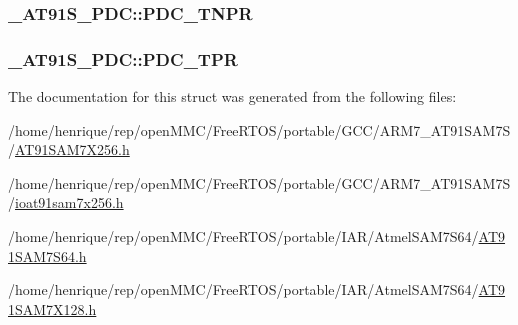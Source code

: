\hypertarget{struct__AT91S__PDC_a21220f0508a5ec5c7737a82afa89dc35}{
\subsubsection[{P\-D\-C\-\_\-\-T\-N\-P\-R}]{ \-\_\-\-A\-T91\-S\-\_\-\-P\-D\-C\-::\-P\-D\-C\-\_\-\-T\-N\-P\-R}}\label{struct__AT91S__PDC_a21220f0508a5ec5c7737a82afa89dc35}
\hypertarget{struct__AT91S__PDC_a15d473588119af649205c986be0e6639}{
\subsubsection[{P\-D\-C\-\_\-\-T\-P\-R}]{ \-\_\-\-A\-T91\-S\-\_\-\-P\-D\-C\-::\-P\-D\-C\-\_\-\-T\-P\-R}}\label{struct__AT91S__PDC_a15d473588119af649205c986be0e6639}


The documentation for this struct was generated from the following files\-:\begin{DoxyCompactItemize}
\item 
/home/henrique/rep/open\-M\-M\-C/\-Free\-R\-T\-O\-S/portable/\-G\-C\-C/\-A\-R\-M7\-\_\-\-A\-T91\-S\-A\-M7\-S/\hyperlink{GCC_2ARM7__AT91SAM7S_2AT91SAM7X256_8h}{A\-T91\-S\-A\-M7\-X256.\-h}\item 
/home/henrique/rep/open\-M\-M\-C/\-Free\-R\-T\-O\-S/portable/\-G\-C\-C/\-A\-R\-M7\-\_\-\-A\-T91\-S\-A\-M7\-S/\hyperlink{ioat91sam7x256_8h}{ioat91sam7x256.\-h}\item 
/home/henrique/rep/open\-M\-M\-C/\-Free\-R\-T\-O\-S/portable/\-I\-A\-R/\-Atmel\-S\-A\-M7\-S64/\hyperlink{AT91SAM7S64_8h}{A\-T91\-S\-A\-M7\-S64.\-h}\item 
/home/henrique/rep/open\-M\-M\-C/\-Free\-R\-T\-O\-S/portable/\-I\-A\-R/\-Atmel\-S\-A\-M7\-S64/\hyperlink{AT91SAM7X128_8h}{A\-T91\-S\-A\-M7\-X128.\-h}\end{DoxyCompactItemize}
